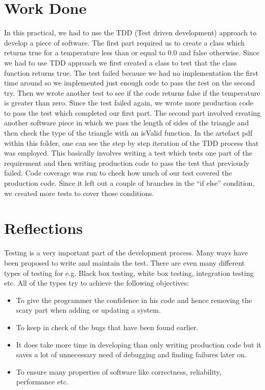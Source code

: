 \section{Work Done}

In this practical, we had to use the TDD (Test driven development) approach to develop a piece of software. The first part required us to create a class which returns true for a temperature less than or equal to 0.0 and false otherwise. Since we had to use TDD approach we first created a class to test that the class function returns true. The test failed because we had no implementation the first time around so we implemented just enough code to pass the test on the second try. Then we wrote another test to see if the code returns false if the temperature is greater than zero. Since the test failed again, we wrote more production code to pass the test which completed our first part. The second part involved creating another software piece in which we pass the length of sides of the triangle and then check the type of the triangle with an isValid function. In the artefact pdf within this folder, one can see the step by step iteration of the TDD process that was employed. This basically involves writing a test which tests one part of the requirement and then writing production code to pass the test that previously failed. Code coverage was run to check how much of our test covered the production code. Since it left out a couple of branches in the ``if else'' condition, we created more tests to cover those conditions.

\section{Reflections}

Testing is a very important part of the development process. Many ways have been proposed to write and maintain the test. There are even many different types of testing for e.g. Black box testing, white box testing, integration testing etc. All of the types try to achieve the following objectives:

\begin{itemize}
    \item To give the programmer the confidence in his code and hence removing the scary part when adding or updating a system.
    \item To keep in check of the bugs that have been found earlier.
    \item It does take more time in developing than only writing production code but it saves a lot of unnecessary need of debugging and finding failures later on.
    \item To ensure many properties of software like correctness, reliability, performance etc.
\end{itemize}


